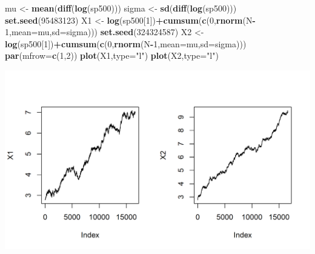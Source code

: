 \documentclass[]{article}
\newenvironment{Shaded}{\begin{snugshade}}{\end{snugshade}}
\newcommand{\KeywordTok}[1]{\textcolor[rgb]{0.13,0.29,0.53}{\textbf{#1}}}
\newcommand{\DataTypeTok}[1]{\textcolor[rgb]{0.13,0.29,0.53}{#1}}
\newcommand{\DecValTok}[1]{\textcolor[rgb]{0.00,0.00,0.81}{#1}}
\newcommand{\StringTok}[1]{\textcolor[rgb]{0.31,0.60,0.02}{#1}}
\newcommand{\OperatorTok}[1]{\textcolor[rgb]{0.81,0.36,0.00}{\textbf{#1}}}
\newcommand{\NormalTok}[1]{#1}
\begin{document}
\begin{Shaded}
\begin{Highlighting}[]
\NormalTok{mu <-}\StringTok{ }\KeywordTok{mean}\NormalTok{(}\KeywordTok{diff}\NormalTok{(}\KeywordTok{log}\NormalTok{(sp500)))}
\NormalTok{sigma <-}\StringTok{ }\KeywordTok{sd}\NormalTok{(}\KeywordTok{diff}\NormalTok{(}\KeywordTok{log}\NormalTok{(sp500)))}
\KeywordTok{set.seed}\NormalTok{(}\DecValTok{95483123}\NormalTok{)}
\NormalTok{X1 <-}\StringTok{ }\KeywordTok{log}\NormalTok{(sp500[}\DecValTok{1}\NormalTok{])}\OperatorTok{+}\KeywordTok{cumsum}\NormalTok{(}\KeywordTok{c}\NormalTok{(}\DecValTok{0}\NormalTok{,}\KeywordTok{rnorm}\NormalTok{(N}\OperatorTok{-}\DecValTok{1}\NormalTok{,}\DataTypeTok{mean=}\NormalTok{mu,}\DataTypeTok{sd=}\NormalTok{sigma)))}
\KeywordTok{set.seed}\NormalTok{(}\DecValTok{324324587}\NormalTok{)}
\NormalTok{X2 <-}\StringTok{ }\KeywordTok{log}\NormalTok{(sp500[}\DecValTok{1}\NormalTok{])}\OperatorTok{+}\KeywordTok{cumsum}\NormalTok{(}\KeywordTok{c}\NormalTok{(}\DecValTok{0}\NormalTok{,}\KeywordTok{rnorm}\NormalTok{(N}\OperatorTok{-}\DecValTok{1}\NormalTok{,}\DataTypeTok{mean=}\NormalTok{mu,}\DataTypeTok{sd=}\NormalTok{sigma)))}
\KeywordTok{par}\NormalTok{(}\DataTypeTok{mfrow=}\KeywordTok{c}\NormalTok{(}\DecValTok{1}\NormalTok{,}\DecValTok{2}\NormalTok{))}
\KeywordTok{plot}\NormalTok{(X1,}\DataTypeTok{type=}\StringTok{"l"}\NormalTok{)}
\KeywordTok{plot}\NormalTok{(X2,}\DataTypeTok{type=}\StringTok{"l"}\NormalTok{)}
\end{Highlighting}
\end{Shaded}
\includegraphics{figure/intro-sp500params-1.png}
\end{document}
